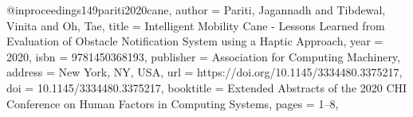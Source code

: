 @inproceedings{149pariti2020cane,
author = {Pariti, Jagannadh and Tibdewal, Vinita and Oh, Tae},
title = {Intelligent Mobility Cane - Lessons Learned from Evaluation of Obstacle Notification System using a Haptic Approach},
year = {2020},
isbn = {9781450368193},
publisher = {Association for Computing Machinery},
address = {New York, NY, USA},
url = {https://doi.org/10.1145/3334480.3375217},
doi = {10.1145/3334480.3375217},
booktitle = {Extended Abstracts of the 2020 CHI Conference on Human Factors in Computing Systems},
pages = {1–8},
}